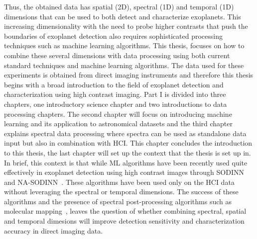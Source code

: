 Thus, the obtained data has spatial (2D), spectral (1D) and temporal (1D) dimensions that can be used to both detect and characterize exoplanets.
This increasing dimensionality with the need to probe higher contrasts that push the boundaries of exoplanet detection also requires sophisticated processing techniques such as machine learning algorithms.
This thesis, focuses on how to combine these several dimensions with data processing using both current standard techniques and machine learning algorithms.
The data used for these experiments is obtained from direct imaging instruments and therefore this thesis begins with a broad introduction to the field of exoplanet detection and characterization using high contrast imaging.
Part I is divided into three chapters, one introductory science chapter and two introductions to data processing chapters.
The second chapter will focus on introducing machine learning and its application to astronomical datasets and the third chapter explains spectral data processing where spectra can be used as standalone data input but also in combination with HCI.
This chapter concludes the introduction to this thesis, the last chapter will set up the context that the thesis is set up in.
In brief, this context is that while ML algorithms have been recently used quite effectively in exoplanet detection using high contrast images through SODINN~\citep[][]{2018Gomez}
and NA-SODINN~\citep[][]{2023Carlito}.
These algorithms have been used only on the HCI data without leveraging the spectral or temporal dimensions. 
The success of these algorithms and the presence of spectral post-processing algorithms such as molecular mapping~\citep[][]{2018AHoeijmakersMM},
leaves the question of whether combining spectral, spatial and temporal dimesions will improve detection sensitivity and characterization accuracy in direct imaging data.


